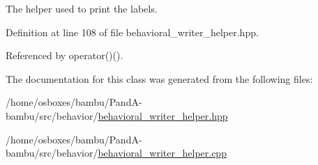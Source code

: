 The helper used to print the labels. 



Definition at line 108 of file behavioral\+\_\+writer\+\_\+helper.\+hpp.



Referenced by operator()().



The documentation for this class was generated from the following files\+:\begin{DoxyCompactItemize}
\item 
/home/osboxes/bambu/\+Pand\+A-\/bambu/src/behavior/\hyperlink{behavioral__writer__helper_8hpp}{behavioral\+\_\+writer\+\_\+helper.\+hpp}\item 
/home/osboxes/bambu/\+Pand\+A-\/bambu/src/behavior/\hyperlink{behavioral__writer__helper_8cpp}{behavioral\+\_\+writer\+\_\+helper.\+cpp}\end{DoxyCompactItemize}
